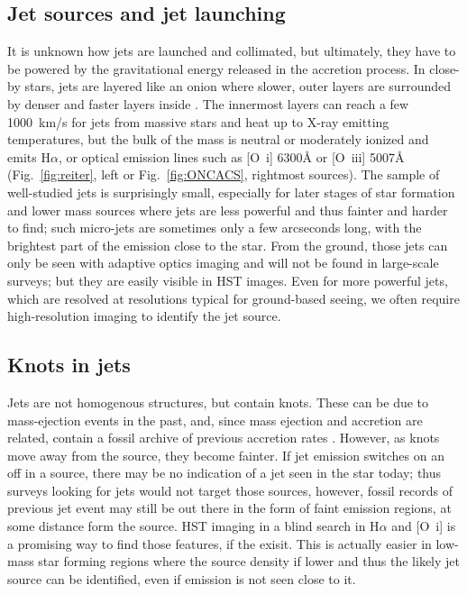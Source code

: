 \documentclass[12pt]{article}
\begin{document}
\subsection{Jet sources and jet launching}
It is unknown how jets are launched and collimated, but ultimately, they have
to be powered by the gravitational energy released in the accretion process. In
close-by stars, jets are layered like an onion where slower, outer layers are
surrounded by denser and faster layers inside \citep{2000ApJ...537L..49B}. The
innermost layers can reach a few 1000~km/s for jets from massive stars and heat
up to X-ray emitting temperatures, but the bulk of the mass is neutral or
moderately ionized and emits H$\alpha$, or optical emission lines such as
[O~{\sc i}] 6300\AA{} or [O~{\sc iii}] 5007\AA{} (Fig.~\ref{fig:reiter},
left or Fig.~\ref{fig:ONCACS}, rightmost sources). The sample of well-studied jets is surprisingly small, especially for
later stages of star formation and lower mass sources where jets are less
powerful and thus fainter and harder to find; such micro-jets are sometimes
only a few arcseconds long, with the brightest part of the emission close to
the star. From the ground, those jets can only be seen with adaptive optics
imaging and will not be found in large-scale surveys; but they are easily
visible in HST images. Even for more powerful jets, which are resolved at
resolutions typical for ground-based seeing, we often require high-resolution
imaging to identify the jet source.


\subsection{Knots in jets}
Jets are not homogenous structures, but contain knots. These can be due to mass-ejection events in the past, and, since mass ejection and accretion are related, contain a fossil archive of previous accretion rates \citep{2014A&A...563A..87E}. However, as knots move away from the source, they become fainter. If jet emission switches on an off in a source, there may be no indication of a jet seen in the star today; thus surveys looking for jets would not target those sources, however, fossil records of previous jet event may still be out there in the form of faint emission regions, at some distance form the source. HST imaging in a blind search in H$\alpha$ and [O~{\sc i}] is a promising way to find those features, if the exisit. This is actually easier in low-mass star forming regions where the source density if lower and thus the likely jet source can be identified, even if emission is not seen close to it.
\end{document}
